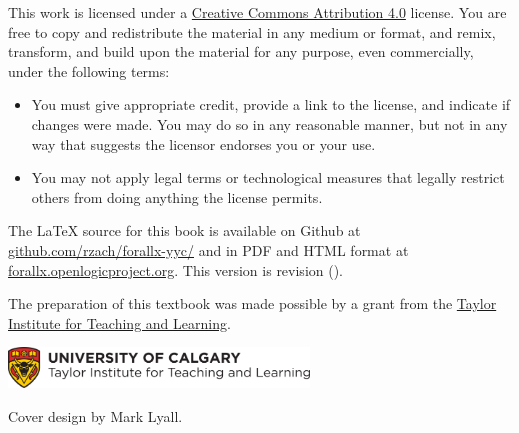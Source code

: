 \ifHTMLtarget\else
  \bigskip

  \noindent\footnotesize
\fi
This work is licensed under a \href{https://creativecommons.org/licenses/by/4.0/}{Creative Commons Attribution 4.0} license.
You are free to copy and redistribute the material in any medium or format, and  remix, transform, and build upon the material for any purpose, even commercially, under the following terms:
\begin{itemize}
\item You must give appropriate credit, provide a link to the license, and indicate if changes were made. You may do so in any reasonable manner, but not in any way that suggests the licensor endorses you or your use.
\item You may not apply legal terms or technological measures that legally restrict others from doing anything the license permits.
\end{itemize}

\ifHTMLtarget\else
\vfil\normalsize\noindent
\fi
The \LaTeX{} source for this book is available on Github at
\href{https://github.com/rzach/forallx-yyc/}{github.com/rzach/forallx-yyc/} and in PDF and
HTML format at
\href{https://forallx.openlogicproject.org}{forallx.openlogicproject.org}.
This version is revision \gitAbbrevHash{}
(\gitAuthorDate).

\bigskip
\noindent
The preparation of this textbook was made possible by a grant from the \href{https://taylorinstitute.ucalgary.ca/}{Taylor Institute for Teaching and Learning}.

\bigskip
\noindent
\href{https://taylorinstitute.ucalgary.ca/}{\includegraphics[width=8cm]{assets/ti-color}}

\ifHTMLtarget\else
\bigskip
\noindent Cover design by Mark Lyall.
\fi
